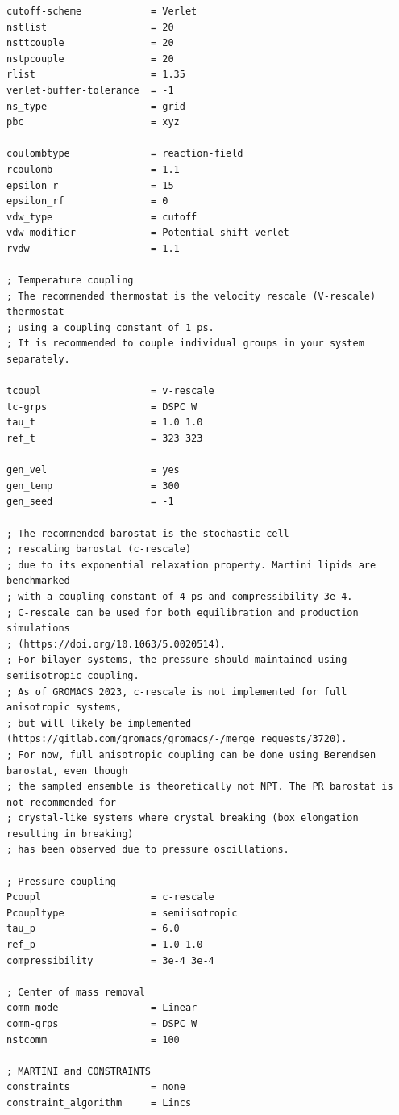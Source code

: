 \begin{vlinesbox}
\begin{verbatim}
cutoff-scheme            = Verlet
nstlist                  = 20
nsttcouple               = 20
nstpcouple               = 20
rlist                    = 1.35
verlet-buffer-tolerance  = -1
ns_type                  = grid
pbc                      = xyz

coulombtype              = reaction-field
rcoulomb                 = 1.1
epsilon_r                = 15
epsilon_rf               = 0
vdw_type                 = cutoff
vdw-modifier             = Potential-shift-verlet
rvdw                     = 1.1

; Temperature coupling
; The recommended thermostat is the velocity rescale (V-rescale) thermostat
; using a coupling constant of 1 ps.
; It is recommended to couple individual groups in your system separately.

tcoupl                   = v-rescale
tc-grps                  = DSPC W
tau_t                    = 1.0 1.0
ref_t                    = 323 323

gen_vel                  = yes
gen_temp                 = 300
gen_seed                 = -1

; The recommended barostat is the stochastic cell
; rescaling barostat (c-rescale)
; due to its exponential relaxation property. Martini lipids are benchmarked
; with a coupling constant of 4 ps and compressibility 3e-4.
; C-rescale can be used for both equilibration and production simulations
; (https://doi.org/10.1063/5.0020514).
; For bilayer systems, the pressure should maintained using semiisotropic coupling.
; As of GROMACS 2023, c-rescale is not implemented for full anisotropic systems,
; but will likely be implemented (https://gitlab.com/gromacs/gromacs/-/merge_requests/3720).
; For now, full anisotropic coupling can be done using Berendsen barostat, even though
; the sampled ensemble is theoretically not NPT. The PR barostat is not recommended for
; crystal-like systems where crystal breaking (box elongation resulting in breaking)
; has been observed due to pressure oscillations.

; Pressure coupling
Pcoupl                   = c-rescale
Pcoupltype               = semiisotropic
tau_p                    = 6.0
ref_p                    = 1.0 1.0
compressibility          = 3e-4 3e-4

; Center of mass removal
comm-mode                = Linear
comm-grps                = DSPC W
nstcomm                  = 100

; MARTINI and CONSTRAINTS
constraints              = none
constraint_algorithm     = Lincs
    \end{verbatim}
\end{vlinesbox}


